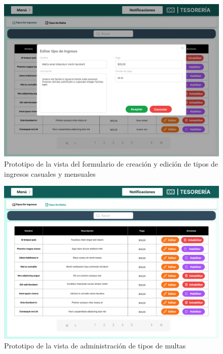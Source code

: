 \begin{figure}[H]
    \centering
    \includegraphics[width=1\textwidth]{resources/images/tesoreia - tipos edit}
    \caption{Prototipo de la vista del formulario de creación y edición de tipos de ingresos casuales y mensuales}
    \label{fig:tesoreria-tipos-edit}
\end{figure}

\begin{figure}[H]
    \centering
    \includegraphics[width=1\textwidth]{resources/images/tesoreia - multas}
    \caption{Prototipo de la vista de administración de tipos de multas}
    \label{fig:tesoreria-tipos-multas}
\end{figure}

